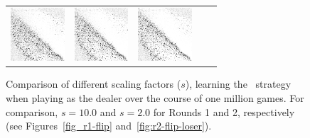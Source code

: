 \begin{figure}[h]
\begin{tabular}{c | c c c c}
			\parbox[c]{5em}{\includegraphics[width=2cm]{images/findings/experiments/learning_rate/lr_150_500.png}} & %
			\parbox[c]{5em}{\includegraphics[width=2cm]{images/findings/experiments/learning_rate/lr_150_750.png}} & %
			\parbox[c]{5em}{\includegraphics[width=2cm]{images/findings/experiments/learning_rate/lr_150_1mm.png}} \\ %
	\end{tabular}

\caption{
	Comparison of different scaling factors ($s$),
	learning the \handmaxavg\ strategy
	when playing as the dealer
	over the course of one million games.
	For comparison, $s = 10.0$ and $s = 2.0$ for Rounds 1 and 2, respectively
	(see Figures~\ref{fig_r1-flip} and~\ref{fig:r2-flip-loser}).
	}
\label{fig:expts-lr-comp}
\end{figure}
